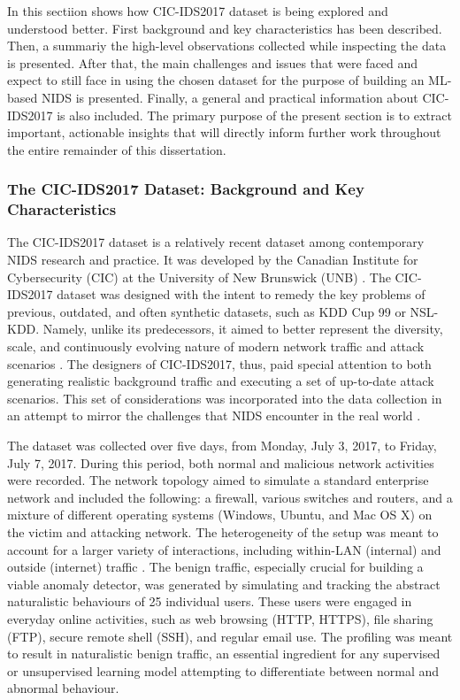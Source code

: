 In this sectiion shows how CIC-IDS2017 dataset is being explored and understood better. First background and key characteristics has been described. Then, a summariy the high-level observations collected while inspecting the data is presented. After that, the main challenges and issues that were faced and expect to still face in using the chosen dataset for the purpose of building an ML-based NIDS is presented. Finally, a general and practical information about CIC-IDS2017 is also included. The primary purpose of the present section is to extract important, actionable insights that will directly inform further work throughout the entire remainder of this dissertation.

\subsubsection{The CIC-IDS2017 Dataset: Background and Key Characteristics} 
The CIC-IDS2017 dataset is a relatively recent dataset among contemporary NIDS research and practice. It was developed by the Canadian Institute for Cybersecurity (CIC) at the University of New Brunswick (UNB) \parencite {sharafaldin2018toward}. The CIC-IDS2017 dataset was designed with the intent to remedy the key problems of previous, outdated, and often synthetic datasets, such as KDD Cup 99 or NSL-KDD. Namely, unlike its predecessors, it aimed to better represent the diversity, scale, and continuously evolving nature of modern network traffic and attack scenarios \parencite {agrawal2021survey}. The designers of CIC-IDS2017, thus, paid special attention to both generating realistic background traffic and executing a set of up-to-date attack scenarios. This set of considerations was incorporated into the data collection in an attempt to mirror the challenges that NIDS encounter in the real world \parencite {aldhubaib2024network}.

The dataset was collected over five days, from Monday, July 3, 2017, to Friday, July 7, 2017. During this period, both normal and malicious network activities were recorded. The network topology aimed to simulate a standard enterprise network and included the following: a firewall, various switches and routers, and a mixture of different operating systems (Windows, Ubuntu, and Mac OS X) on the victim and attacking network. The heterogeneity of the setup was meant to account for a larger variety of interactions, including within-LAN (internal) and outside (internet) traffic \parencite {kumar2021cicids}. The benign traffic, especially crucial for building a viable anomaly detector, was generated by simulating and tracking the abstract naturalistic behaviours of 25 individual users. These users were engaged in everyday online activities, such as web browsing (HTTP, HTTPS), file sharing (FTP), secure remote shell (SSH), and regular email use. The profiling was meant to result in naturalistic benign traffic, an essential ingredient for any supervised or unsupervised learning model attempting to differentiate between normal and abnormal behaviour.

